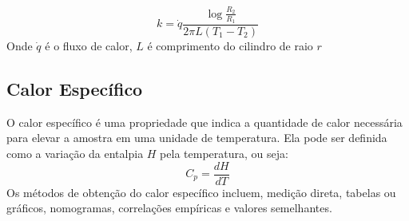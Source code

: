 \begin{equation}\label{eq:medida_experimental}
    k = \dot{q} \frac{\log \frac{R_2}{R_1}}{2\pi L\left( T_1 - T_2 \right) }
\end{equation}
Onde \(\dot{q}\) é o fluxo de calor, \(L\) é comprimento do cilindro de raio \(r\)
\subsection{Calor Específico}
O calor específico é uma propriedade que indica a quantidade de calor necessária para elevar a
amostra em uma unidade de temperatura. Ela pode ser definida como a variação da entalpia \(H\) pela
temperatura, ou seja:
\begin{equation}\label{eq:calor_especifico_derivada }
    C_{p}  = \frac{dH}{dT}
\end{equation}
Os métodos de obtenção do calor específico incluem, medição direta, tabelas ou gráficos, nomogramas,
correlações empíricas e valores semelhantes. \par

